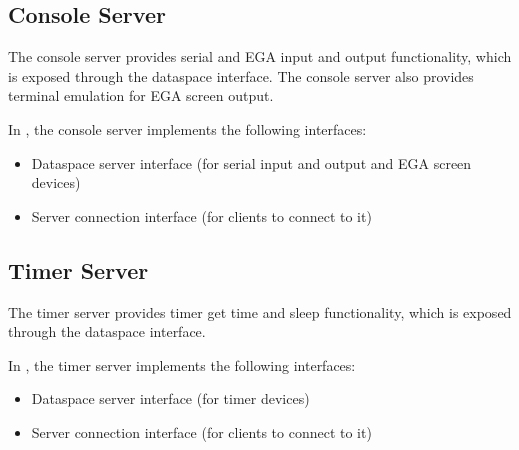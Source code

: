 \subsection{Console Server}

The console server provides serial and EGA input and output functionality, which is exposed through the dataspace interface. The console server also provides terminal emulation for EGA screen output.

In , the console server implements the following interfaces:
\begin{itemize}
    \item Dataspace server interface (for serial input and output and EGA screen devices)
    \item Server connection interface (for clients to connect to it)
\end{itemize}

\subsection{Timer Server}

The timer server provides timer get time and sleep functionality, which is exposed through the dataspace interface.

In , the timer server implements the following interfaces:
\begin{itemize}
    \item Dataspace server interface (for timer devices)
    \item Server connection interface (for clients to connect to it)
\end{itemize}
